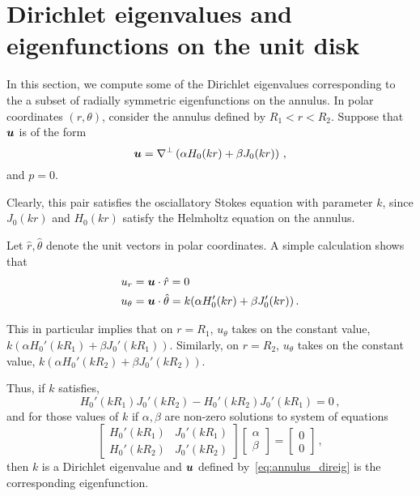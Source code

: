 \section{Dirichlet eigenvalues and eigenfunctions on the unit disk}
In this section, we compute some of the Dirichlet eigenvalues
corresponding to the a subset of radially symmetric eigenfunctions
on the annulus. 
In polar coordinates $(r,\theta)$, consider the annulus defined by 
$R_{1}<r<R_{2}$. 
Suppose that ${\boldsymbol u}$ is of the form 
\begin{equation}
{\boldsymbol u} = \nabla^{\perp}\left( \alpha H_{0}(kr) + \beta J_{0}(kr) \right) \, ,
\label{eq:annulus_direig}
\end{equation}
and $p=0$.

Clearly, this pair satisfies the osciallatory Stokes equation
with parameter $k$, since $J_{0}(kr)$ and $H_{0}(kr)$ 
satisfy the Helmholtz equation on the annulus.

Let $\hat{r},\hat{\theta}$ denote the unit vectors in polar coordinates.
A simple calculation shows that 
\begin{equation}
\begin{aligned}
u_{r} &= {\boldsymbol u} \cdot \hat{r}  = 0 \, \\
u_{\theta} &= {\boldsymbol u} \cdot \hat{\theta} = k(\alpha  H_{0}'(kr) + \beta J_{0}'(kr)) \, .
\end{aligned}
\end{equation}

This in particular implies that on $r=R_{1}$,
$u_{\theta}$ takes on the constant value,
$k(\alpha H_{0}'(kR_{1}) + \beta J_{0}'(kR_{1}))$.
Similarly, on $r=R_{2}$, 
$u_{\theta}$ takes on the constant value,
$k(\alpha H_{0}'(kR_{2}) + \beta J_{0}'(kR_{2}))$.

Thus, if $k$ satisfies, 
\begin{equation}
H_{0}'(kR_{1}) J_{0}'(kR_{2}) - H_{0}'(kR_{2})J_{0}'(kR_{1}) = 0 \, ,
\end{equation}
and for those values of $k$ if 
$\alpha,\beta$ are non-zero solutions to system of equations 
\begin{equation}
\begin{bmatrix}
H_{0}'(kR_1) & J_{0}'(kR_{1}) \\
H_{0}'(kR_{2}) & J_{0}'(kR_{2}) 
\end{bmatrix}
\begin{bmatrix}
\alpha \\
\beta
\end{bmatrix}
=
\begin{bmatrix}
0 \\
0
\end{bmatrix}
\, ,
\end{equation}
then $k$ is a Dirichlet eigenvalue and ${\boldsymbol u}$ 
defined by~\cref{eq:annulus_direig}
is the corresponding eigenfunction.

